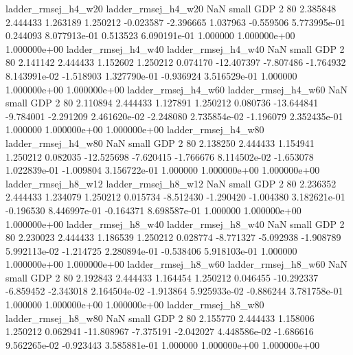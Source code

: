      ladder_rmsej_h4_w20      ladder_rmsej_h4_w20                   NaN      small      GDP                 2 80 2.385848       2.444433 1.263189       1.250212   -0.023587     -2.396665      1.037963    -0.559506   5.773995e-01  0.244093 8.077913e-01     0.513523   6.090191e-01            1.000000    1.000000e+00        1.000000e+00
     ladder_rmsej_h4_w40      ladder_rmsej_h4_w40                   NaN      small      GDP                 2 80 2.141142       2.444433 1.152602       1.250212    0.074170    -12.407397     -7.807486    -1.764932   8.143991e-02 -1.518903 1.327790e-01    -0.936924   3.516529e-01            1.000000    1.000000e+00        1.000000e+00
     ladder_rmsej_h4_w60      ladder_rmsej_h4_w60                   NaN      small      GDP                 2 80 2.110894       2.444433 1.127891       1.250212    0.080736    -13.644841     -9.784001    -2.291209   2.461620e-02 -2.248080 2.735854e-02    -1.196079   2.352435e-01            1.000000    1.000000e+00        1.000000e+00
     ladder_rmsej_h4_w80      ladder_rmsej_h4_w80                   NaN      small      GDP                 2 80 2.138250       2.444433 1.154941       1.250212    0.082035    -12.525698     -7.620415    -1.766676   8.114502e-02 -1.653078 1.022839e-01    -1.009804   3.156722e-01            1.000000    1.000000e+00        1.000000e+00
     ladder_rmsej_h8_w12      ladder_rmsej_h8_w12                   NaN      small      GDP                 2 80 2.236352       2.444433 1.234079       1.250212    0.015734     -8.512430     -1.290420    -1.004380   3.182621e-01 -0.196530 8.446997e-01    -0.164371   8.698587e-01            1.000000    1.000000e+00        1.000000e+00
     ladder_rmsej_h8_w40      ladder_rmsej_h8_w40                   NaN      small      GDP                 2 80 2.230023       2.444433 1.186539       1.250212    0.028774     -8.771327     -5.092938    -1.908789   5.992113e-02 -1.214725 2.280894e-01    -0.538406   5.918103e-01            1.000000    1.000000e+00        1.000000e+00
     ladder_rmsej_h8_w60      ladder_rmsej_h8_w60                   NaN      small      GDP                 2 80 2.192843       2.444433 1.164454       1.250212    0.046455    -10.292337     -6.859452    -2.343018   2.164504e-02 -1.913864 5.925933e-02    -0.886244   3.781758e-01            1.000000    1.000000e+00        1.000000e+00
     ladder_rmsej_h8_w80      ladder_rmsej_h8_w80                   NaN      small      GDP                 2 80 2.155770       2.444433 1.158006       1.250212    0.062941    -11.808967     -7.375191    -2.042027   4.448586e-02 -1.686616 9.562265e-02    -0.923443   3.585881e-01            1.000000    1.000000e+00        1.000000e+00
